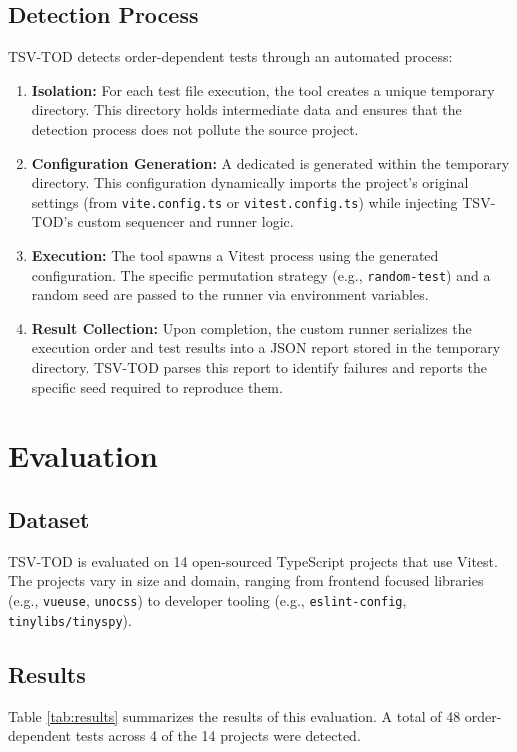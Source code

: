 \documentclass[10pt, conference]{IEEEtran}
\begin{document}
\subsection{Detection Process}
TSV-TOD detects order-dependent tests through an automated process:
\begin{enumerate}
    \item \textbf{Isolation:} For each test file execution, the tool creates a unique temporary directory. This directory holds intermediate data and ensures that the detection process does not pollute the source project.
    \item \textbf{Configuration Generation:} A dedicated \texttt{} is generated within the temporary directory. This configuration dynamically imports the project's original settings (from \texttt{vite.config.ts} or \texttt{vitest.config.ts}) while injecting TSV-TOD's custom sequencer and runner logic.
    \item \textbf{Execution:} The tool spawns a Vitest process using the generated configuration. The specific permutation strategy (e.g., \texttt{random-test}) and a random seed are passed to the runner via environment variables.
    \item \textbf{Result Collection:} Upon completion, the custom runner serializes the execution order and test results into a JSON report stored in the temporary directory. TSV-TOD parses this report to identify failures and reports the specific seed required to reproduce them.
\end{enumerate}

\section{Evaluation}

\subsection{Dataset}
TSV-TOD is evaluated on 14 open-sourced TypeScript projects that use Vitest. The projects vary in size and domain, ranging from frontend focused libraries (e.g., \texttt{vueuse}, \texttt{unocss}) to developer tooling (e.g., \texttt{eslint-config}, \texttt{tinylibs/tinyspy}).

\subsection{Results}
Table \ref{tab:results} summarizes the results of this evaluation. A total of 48 order-dependent tests across 4 of the 14 projects were detected.
\end{document}
